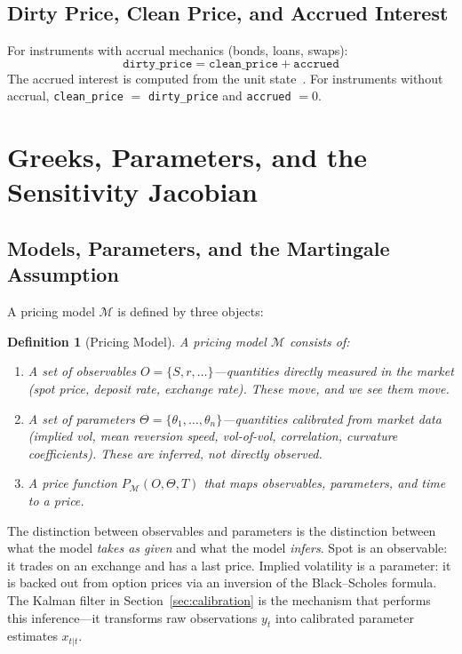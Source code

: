 \documentclass[11pt,a4paper]{article}
\newtheorem{definition}{Definition}[section]
\begin{document}
\subsection{Dirty Price, Clean Price, and Accrued Interest}

For instruments with accrual mechanics (bonds, loans, swaps):
\[
\texttt{dirty\_price} = \texttt{clean\_price} + \texttt{accrued}
\]
The accrued interest is computed from the unit state~\cite[\S7]{ledger}.  For instruments without accrual, \texttt{clean\_price} $=$ \texttt{dirty\_price} and \texttt{accrued} $= 0$.

\clearpage
\section{Greeks, Parameters, and the Sensitivity Jacobian}
\label{sec:greeks}

\subsection{Models, Parameters, and the Martingale Assumption}
\label{sec:model-params}

A pricing model $\mathcal{M}$ is defined by three objects:

\begin{definition}[Pricing Model]
\label{def:pricing-model}
A pricing model $\mathcal{M}$ consists of:
\begin{enumerate}[nosep]
\item A set of \emph{observables} $O = \{S, r, \ldots\}$---quantities directly measured in the market (spot price, deposit rate, exchange rate).  These move, and we see them move.
\item A set of \emph{parameters} $\Theta = \{\theta_1, \ldots, \theta_n\}$---quantities calibrated from market data (implied vol, mean reversion speed, vol-of-vol, correlation, curvature coefficients).  These are inferred, not directly observed.
\item A price function $P_\mathcal{M}(O, \Theta, T)$ that maps observables, parameters, and time to a price.
\end{enumerate}
\end{definition}

The distinction between observables and parameters is the distinction between what the model \emph{takes as given} and what the model \emph{infers}.  Spot is an observable: it trades on an exchange and has a last price.  Implied volatility is a parameter: it is backed out from option prices via an inversion of the Black--Scholes formula.  The Kalman filter in Section~\ref{sec:calibration} is the mechanism that performs this inference---it transforms raw observations $y_t$ into calibrated parameter estimates $x_{t|t}$.
\end{document}
